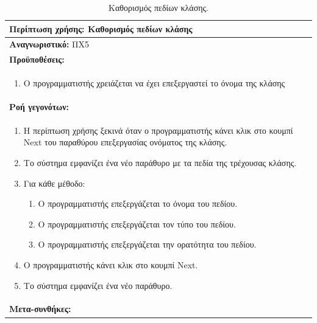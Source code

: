 \begin{table}[H]
	\hspace*{-0.2cm}
    \centering
    \scriptsize
	\begin{tabular}{|p{10cm}|}
	\hline
		\textbf{Περίπτωση χρήσης:} Καθορισμός πεδίων κλάσης \\
	\hline
		\textbf{Αναγνωριστικό:} ΠΧ5 \\
	\hline	
		\textbf{Προϋποθέσεις:} \\
		\begin{enumerate}
		 \item Ο προγραμματιστής χρειάζεται να έχει επεξεργαστεί το όνομα της κλάσης
		\end{enumerate} \\
	\hline
		\textbf{Ροή γεγονότων:} \\
		\begin{enumerate}
		 \item Η περίπτωση χρήσης ξεκινά όταν ο προγραμματιστής κάνει κλικ στο κουμπί Next του παραθύρου επεξεργασίας ονόματος της κλάσης.
		 \item Το σύστημα εμφανίζει ένα νέο παράθυρο με τα πεδία της τρέχουσας κλάσης.
		 \item Για κάθε μέθοδο:\begin{enumerate}
						 		 \item Ο προγραμματιστής επεξεργάζεται το όνομα του πεδίου.
								 \item Ο προγραμματιστής επεξεργάζεται τον τύπο του πεδίου.
		 						 \item Ο προγραμματιστής επεξεργάζεται την ορατότητα του πεδίου.
			 		 		  \end{enumerate}
 		 \item Ο προγραμματιστής κάνει κλικ στο κουμπί Next.
 		 \item Το σύστημα εμφανίζει ένα νέο παράθυρο.
		\end{enumerate} \\
	\hline
		\textbf{Μετα-συνθήκες:} \\
	\hline
    \end{tabular}
    \caption{Καθορισμός πεδίων κλάσης.}
    \label{tab:setClassFieldsUC}
\end{table}

